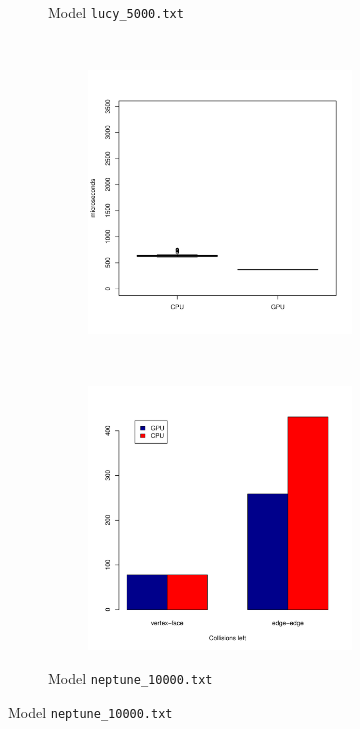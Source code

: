 \begin{figure}
\begin{subfigure}[b]{0.45\textwidth}
\begin{subfigure}[b]{0.45\textwidth}
			\end{subfigure}
			\caption{Model \texttt{lucy\_5000.txt}}
		\end{subfigure}
		~%
		\begin{subfigure}[b]{0.45\textwidth}
			\begin{subfigure}[b]{0.45\textwidth}
				\includegraphics[width=\textwidth]{results/time/neptune_10000}
			\end{subfigure}
			~%
			\begin{subfigure}[b]{0.45\textwidth}
				\includegraphics[width=\textwidth]{results/correctness/neptune_10000}
			\end{subfigure}
			\caption{Model \texttt{neptune\_10000.txt}}
		\end{subfigure}
		

\end{figure}
